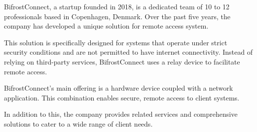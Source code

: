 BifrostConnect, a startup founded in 2018, 
is a dedicated team of 10 to 12 professionals based in Copenhagen, Denmark.
Over the past five years, the company has developed a unique solution for remote access system. 

This solution is specifically designed for systems that operate 
under strict security conditions and are not permitted to have internet connectivity.
Instead of relying on third-party services, BifrostConnect uses a relay device to facilitate remote access.

BifrostConnect's main offering is a hardware device coupled with a network application. 
This combination enables secure, remote access to client systems. 

In addition to this, the company provides related services 
and comprehensive solutions to cater to a wide range of client needs.